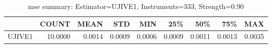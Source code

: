 \begin{table}[ht]
\centering
\caption{mse summary: Estimator=UJIVE1, Instruments=333, Strength=0.90}
\begin{tabular}{lrrrrrrrr}
\toprule
 & COUNT & MEAN & STD & MIN & 25\% & 50\% & 75\% & MAX \\
\midrule
UJIVE1 & 10.0000 & 0.0014 & 0.0009 & 0.0006 & 0.0009 & 0.0011 & 0.0013 & 0.0035 \\
\bottomrule
\end{tabular}
\end{table}
